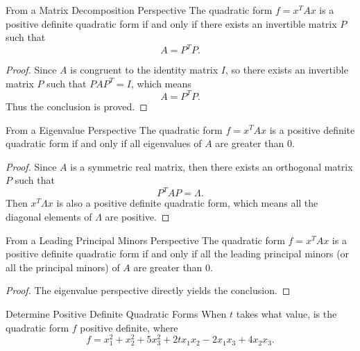 \begin{corollary}{From a Matrix Decomposition Perspective}{}
  The quadratic form $f = x^TAx$ is a positive definite quadratic form if and only if there exists
  an invertible matrix $P$ such that
  \begin{equation}
    A = P^TP.
  \end{equation}
\end{corollary}

\begin{proof}
  Since $A$ is congruent to the identity matrix $I$,
  so there exists an invertible matrix $P$ such that $PAP^T = I$, which means
  \begin{equation}
    A = P^TP.
  \end{equation}
  Thus the conclusion is proved.
\end{proof}

\begin{proposition}{From a Eigenvalue Perspective}{}
  The quadratic form $f = x^TAx$ is a positive definite quadratic form if and
  only if all eigenvalues of $A$ are greater than $0$.
\end{proposition}

\begin{proof}
  Since $A$ is a symmetric real matrix, then there exists an orthogonal matrix
  $P$ such that
  \begin{equation}
    P^TAP = \Lambda.
  \end{equation}
  Then $x^T\Lambda x$ is also a positive definite quadratic form, which means
  all the diagonal elements of $\Lambda$ are positive.
\end{proof}

\begin{corollary}{From a Leading Principal Minors Perspective}{}
  The quadratic form $f = x^TAx$ is a positive definite quadratic form if and
  only if all the leading principal minors (or all the principal minors) of $A$
  are greater than $0$.
\end{corollary}

\begin{proof}
  The eigenvalue perspective directly yields the conclusion.
\end{proof}

\begin{example}{Determine Positive Definite Quadratic Forms}{}
  When $t$ takes what value, is the quadratic form $f$ positive definite, where
  \begin{equation}
    f = x_1^2 + x_2^2 + 5x_3^2 + 2tx_1x_2 - 2x_1x_3 + 4x_2x_3.
  \end{equation}
\end{example}










